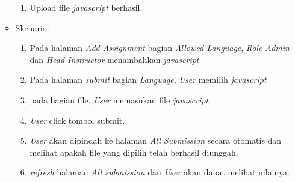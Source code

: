 \begin{itemize}
\begin{itemize}
\begin{enumerate}
                    \item Upload file \textit{javascript} berhasil. 
                \end{enumerate}
            \item Skenario: 
            \begin{enumerate}
                \item Pada halaman \textit{Add Assignment} bagian \textit{Allowed Language},  \textit{Role Admin} dan \textit{Head Instructor} menambahkan \textit{javascript} 
                \item Pada halaman \textit{submit} bagian \textit{Language}, \textit{User} memilih \textit{javascript}
                \item pada bagian file, \textit{User} memasukan file \textit{javascript}
                \item \textit{User} click tombol submit.
                \item \textit{User} akan dipindah ke halaman \textit{All Submission} secara otomatis dan melihat apakah file yang dipilih telah berhasil diunggah.
                \item \textit{refresh} halaman \textit{All submission} dan \textit{User} akan dapat melihat nilainya.
            \end{enumerate}
            \end{itemize}
 \end{itemize}
 

